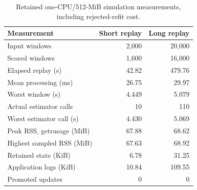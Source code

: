 \begin{table}[H]
\centering\small
\begin{tabular}{lrr}
\toprule
\textbf{Measurement} & \textbf{Short replay} & \textbf{Long replay} \\
\midrule
Input windows & 2,000 & 20,000 \\
Scored windows & 1,600 & 16,000 \\
Elapsed replay (s) & 42.82 & 479.76 \\
Mean processing (ms) & 26.75 & 29.97 \\
Worst window (s) & 4.449 & 5.079 \\
Actual estimator calls & 10 & 110 \\
Worst estimator call (s) & 4.430 & 5.069 \\
Peak RSS, getrusage (MiB) & 67.88 & 68.62 \\
Highest sampled RSS (MiB) & 67.63 & 68.92 \\
Retained state (KiB) & 6.78 & 31.25 \\
Application logs (KiB) & 10.84 & 109.55 \\
Promoted updates & 0 & 0 \\
\bottomrule
\end{tabular}
\caption{Retained one-CPU/512-MiB simulation measurements, including rejected-refit cost.}
\label{tab:edge-measurements}
\end{table}
